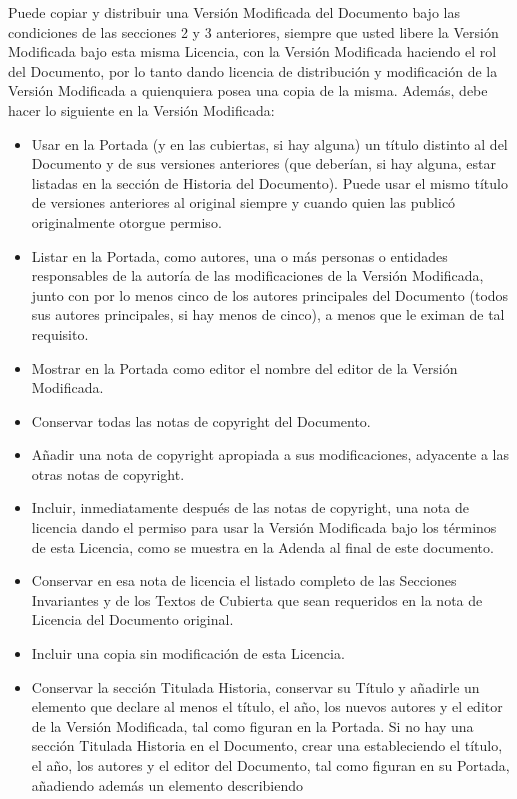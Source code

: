 Puede copiar y distribuir una Versión Modificada del Documento bajo
las condiciones de las secciones 2 y 3 anteriores, siempre que usted
libere la Versión Modificada bajo esta misma Licencia, con la Versión
Modificada haciendo el rol del Documento, por lo tanto dando licencia
de distribución y modificación de la Versión Modificada a quienquiera
posea una copia de la misma. Además, debe hacer lo siguiente en la
Versión Modificada:
\begin{itemize}
\item Usar en la Portada (y en las cubiertas, si hay alguna) un título distinto
al del Documento y de sus versiones anteriores (que deberían, si hay
alguna, estar listadas en la sección de Historia del Documento). Puede
usar el mismo título de versiones anteriores al original siempre y
cuando quien las publicó originalmente otorgue permiso.
\item Listar en la Portada, como autores, una o más personas o entidades
responsables de la autoría de las modificaciones de la Versión Modificada,
junto con por lo menos cinco de los autores principales del Documento
(todos sus autores principales, si hay menos de cinco), a menos que
le eximan de tal requisito.
\item Mostrar en la Portada como editor el nombre del editor de la Versión
Modificada.
\item Conservar todas las notas de copyright del Documento.
\item Añadir una nota de copyright apropiada a sus modificaciones, adyacente
a las otras notas de copyright.
\item Incluir, inmediatamente después de las notas de copyright, una nota
de licencia dando el permiso para usar la Versión Modificada bajo
los términos de esta Licencia, como se muestra en la Adenda al final
de este documento.
\item Conservar en esa nota de licencia el listado completo de las Secciones
Invariantes y de los Textos de Cubierta que sean requeridos en la
nota de Licencia del Documento original.
\item Incluir una copia sin modificación de esta Licencia.
\item Conservar la sección Titulada Historia, conservar su Título y añadirle
un elemento que declare al menos el título, el año, los nuevos autores
y el editor de la Versión Modificada, tal como figuran en la Portada.
Si no hay una sección Titulada Historia en el Documento, crear una
estableciendo el título, el año, los autores y el editor del Documento,
tal como figuran en su Portada, añadiendo además un elemento describiendo

\end{itemize}
